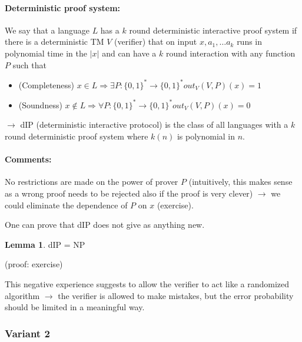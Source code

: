 \documentclass[11pt]{article}
\theoremstyle{definition}
\newtheorem{lemma}[theorem]{Lemma}
\theoremstyle{definition}
\begin{document}
\paragraph{Deterministic proof system:} We say that a language $ L $ has a $ k $ round deterministic interactive proof system if there is a deterministic TM $ V $ (verifier) that on input $ x, a_1, \dots a_k $ runs in polynomial time in the $ | x | $ and can have a $ k $ round interaction with any function $ P $ such that
	
\begin{itemize}
	\item (Completeness) $ x \in L \Rightarrow \exists P: \{0, 1\}^\ast \rightarrow \{0, 1\}^\ast  out_V(V, P)(x) = 1 $
	\item (Soundness) $ x \not \in L \Rightarrow \forall P: \{0, 1\}^\ast \rightarrow \{0, 1\}^\ast out_V(V, P)(x) = 0 $
\end{itemize}

	
$ \rightarrow $ dIP (deterministic interactive protocol) is the class of all languages with a $ k $ round deterministic proof system where $ k(n) $ is polynomial in $ n $.
	
\paragraph{Comments:} No restrictions are made on the power of prover $ P $ (intuitively, this makes sense as a wrong proof needs to be rejected also if the proof is very clever) $ \rightarrow $ we could eliminate the dependence of $ P $ on $ x $ (exercise).

One can prove that dIP does not give as anything new.

\begin{lemma}
dIP = NP
\end{lemma}
(proof: exercise)

This negative experience suggests to allow the verifier to act like a randomized algorithm $ \rightarrow $ the verifier is allowed to make mistakes, but the error probability should be limited in a meaningful way.

\subsubsection{Variant 2}
\end{document}
